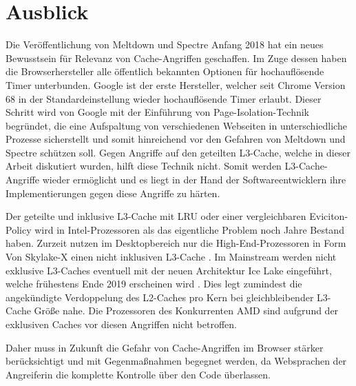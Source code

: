 \section{Ausblick}

Die Veröffentlichung von Meltdown und Spectre Anfang 2018 hat ein neues Bewusstsein für Relevanz von Cache-Angriffen geschaffen.
Im Zuge dessen haben die Browserhersteller alle öffentlich bekannten Optionen für hochauflösende Timer unterbunden.
Google ist der erste Hersteller, welcher seit Chrome Version 68 in der Standardeinstellung wieder hochauflösende Timer erlaubt.
Dieser Schritt wird von Google mit der Einführung von Page-Isolation-Technik \cite{ChromeSiteIsolation} begründet, die eine Aufspaltung von verschiedenen Webseiten in unterschiedliche Prozesse sicherstellt und somit hinreichend vor den Gefahren von Meltdown und Spectre schützen soll.
Gegen Angriffe auf den geteilten L3-Cache, welche in dieser Arbeit diskutiert wurden, hilft diese Technik nicht.
Somit werden L3-Cache-Angriffe wieder ermöglicht und es liegt in der Hand der Softwareentwicklern ihre Implementierungen gegen diese Angriffe zu härten.

Der geteilte und inklusive L3-Cache mit LRU oder einer vergleichbaren Eviciton-Policy wird in Intel-Prozessoren als das eigentliche Problem noch Jahre Bestand haben.
Zurzeit nutzen im Desktopbereich nur die High-End-Prozessoren in Form Von Skylake-X einen nicht inklusiven L3-Cache \cite{SkylakeXL3Cache}.
Im Mainstream werden nicht exklusive L3-Caches eventuell mit der neuen Architektur Ice Lake eingeführt, welche frühestens Ende 2019 erscheinen wird \cite{IceLakeReleaseDate}.
Dies legt zumindest die angekündigte Verdoppelung des L2-Caches pro Kern bei gleichbleibender L3-Cache Größe nahe.
Die Prozessoren des Konkurrenten AMD sind aufgrund der exklusiven Caches \cite{CacheRyzen} vor diesen Angriffen nicht betroffen.

Daher muss in Zukunft die Gefahr von Cache-Angriffen im Browser stärker berücksichtigt und mit Gegenmaßnahmen begegnet werden, da Websprachen der Angreiferin die komplette Kontrolle über den Code überlassen.








